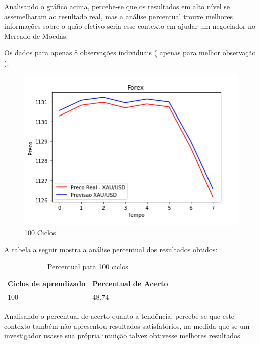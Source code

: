 Analisando o gráfico acima, percebe-se que os resultados em alto nível se assemelharam ao resultado real, mas a análise percentual
trouxe melhores informações sobre o quão efetivo seria esse contexto em ajudar um negociador no Mercado de Moedas.

\pagebreak

Os dados para apenas 8 observações individuais ( apenas para melhor observação ):

\begin{figure}[h]
	\centering
	\includegraphics[keepaspectratio=true,scale=0.8]{figuras/100low.png}
	\caption{100 Ciclos}
	\label{fig18}
\end{figure}

A tabela a seguir mostra a análise percentual dos resultados obtidos:

\begin{table}[h]
	\centering
	\caption{Percentual para 100 ciclos}
	\label{tab09}
  \begin{center}
      \begin{tabular}{ | l | p{5cm}}
      \hline
      Ciclos de aprendizado & Percentual de Acerto \\ \hline
		  100 & 48.74 \\ \hline
      \end{tabular}
  \end{center}
\end{table}

Analisando o percentual de acerto quanto a tendência, percebe-se que este contexto também não apresentou resultados satisfatórios, na
medida que se um investigador usasse sua própria intuição talvez obtivesse melhores resultados.

